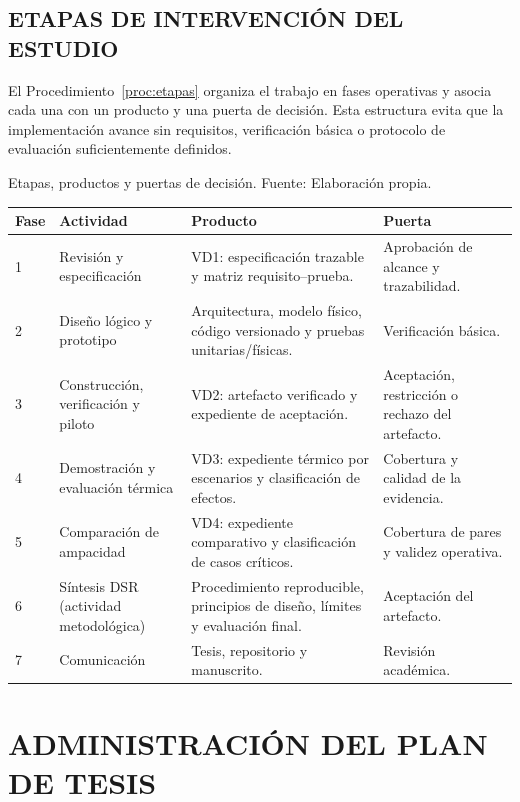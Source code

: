 \documentclass[11pt,a4paper,oneside]{report}
\begin{document}
\section{ETAPAS DE INTERVENCIÓN DEL ESTUDIO}

El Procedimiento~\ref{proc:etapas} organiza el trabajo en fases operativas y asocia cada una con un producto y una puerta de decisión. Esta estructura evita que la implementación avance sin requisitos, verificación básica o protocolo de evaluación suficientemente definidos.

\begin{procedure}[htbp]
\caption{Etapas, productos y puertas de decisión. Fuente: Elaboración propia.}
\label{proc:etapas}
\begin{tabularx}{\textwidth}{C{1.0cm}L{3.4cm}Y L{3.2cm}}
\toprule
\textbf{Fase} & \textbf{Actividad} & \textbf{Producto} & \textbf{Puerta} \\
 & Revisión y especificación & VD1: especificación trazable y matriz requisito--prueba. & Aprobación de alcance y trazabilidad. \\
  2 & Diseño lógico y prototipo & Arquitectura, modelo físico, código versionado y pruebas unitarias/físicas. & Verificación básica. \\
  3 & Construcción, verificación y piloto & VD2: artefacto verificado y expediente de aceptación. & Aceptación, restricción o rechazo del artefacto. \\
  4 & Demostración y evaluación térmica & VD3: expediente térmico por escenarios y clasificación de efectos. & Cobertura y calidad de la evidencia. \\
  5 & Comparación de ampacidad & VD4: expediente comparativo y clasificación de casos críticos. & Cobertura de pares y validez operativa. \\
6 & Síntesis DSR (actividad metodológica) & Procedimiento reproducible, principios de diseño, límites y evaluación final. & Aceptación del artefacto. \\
7 & Comunicación & Tesis, repositorio y manuscrito. & Revisión académica. \\
\bottomrule
\end{tabularx}
\end{procedure}

\chapter{ADMINISTRACIÓN DEL PLAN DE TESIS}
\label{ch:administracion}
\thispagestyle{empty}
\end{document}

